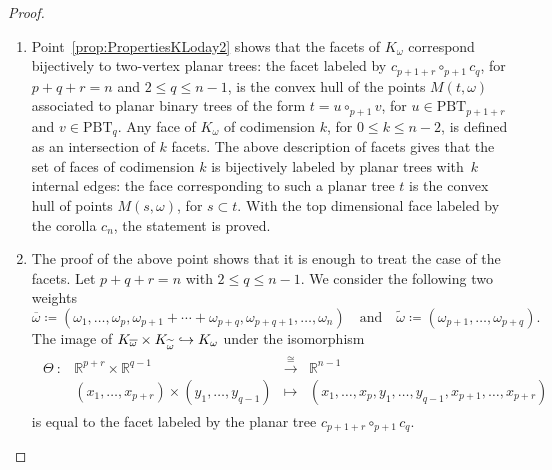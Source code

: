 \documentclass[10pt,a4paper]{amsart}
\numberwithin{equation}{section}\providecommand{\No}{}
\def\hto{\mathrel{\lhook\joinrel\to}}
\theoremstyle{plain}
\theoremstyle{definition}
\newcommand{\RR}{\mathbb{R}}
\newcommand{\K}{{K}}
\newcommand{\Tam}[1]{\mathrm{PBT}_{#1}}
\begin{document}
\begin{proof}
\begin{enumerate}
\item Point~\eqref{prop:PropertiesKLoday2} shows that the facets of $\K_\omega$ correspond bijectively to two-vertex planar trees: the facet labeled by
$c_{p+1+r}\circ_{p+1} c_q$, for $p+q+r=n$ and $2\leq q \leq n-1$, is the convex hull of the points $M(t, \omega)$ associated to planar binary trees of the form $t=u\circ_{p+1} v$, for $u\in\Tam{p+1+r}$ and $v\in \Tam{q}$.
Any face of $\K_\omega$ of codimension $k$, for
$0\leq k \leq n-2$, is defined as an intersection of $k$ facets. The above description of facets gives that the set of faces of codimension $k$ is bijectively labeled by planar trees with~$k$ internal edges: the face corresponding to such a planar tree $t$ is the convex hull of points $M(s, \omega)$, for $s\subset t$. With the top dimensional face labeled by the corolla $c_n$, the statement is proved.

\item The proof of the above point shows that it is enough to treat the case of the facets.
Let $p+q+r=n$ with $2\leq q \leq n-1$. We consider the following two weights
\[
\overline{\omega}\coloneqq (\omega_1, \ldots, \omega_{p}, \omega_{p+1}+\cdots+\omega_{p+q}, \omega_{p+q+1}, \ldots, \omega_{n})
\quad \text{and} \quad
\widetilde{\omega}\coloneqq (\omega_{p+1}, \ldots, \omega_{p+q}).
\]
The image of $\K_{\overline{\omega}}\times \K_{\widetilde{\omega}}\hto \K_\omega$ under the isomorphism
\begin{align*}
\begin{array}{rccc}
\Theta\ : & \RR^{p+r}\times \RR^{q-1} &\xrightarrow{~\cong~} &\RR^{n-1}\\
&(x_1, \ldots, x_{p+r})\times (y_1, \ldots, y_{q-1}) & \longmapsto&
(x_1, \ldots, x_{p}, y_1, \ldots, y_{q-1}, x_{p+1}, \ldots, x_{p+r})
\end{array}
\end{align*}
is equal to the facet labeled by the planar tree $c_{p+1+r}\circ_{p+1} c_q$.\qedhere
\end{enumerate}
\end{proof}
\end{document}
